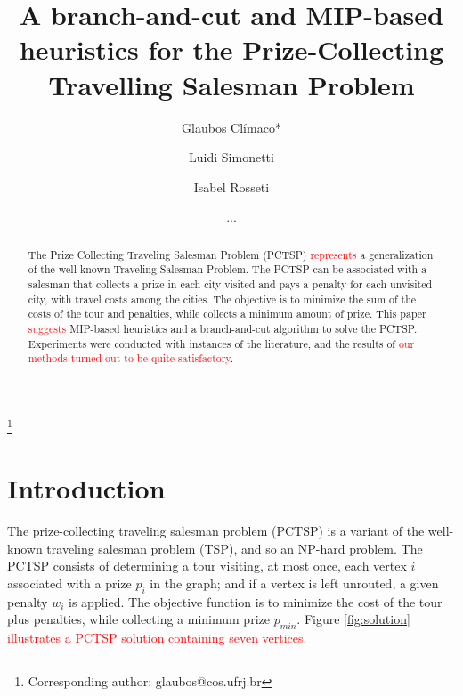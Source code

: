 \documentclass{ro}
\begin{document}
\title{A branch-and-cut and MIP-based heuristics for the Prize-Collecting Travelling Salesman Problem}%
%
\author{Glaubos Cl\'imaco*}\address{Universidade Federal do Rio de Janeiro, PESC-COPPE, Cidade Universit\'aria, Centro de Tecnologia, Bloco H, 21941-972, Rio de Janeiro, Brasil.}\thanks{Corresponding author: glaubos@cos.ufrj.br}
\author{Luidi Simonetti}\address{Universidade Federal do Rio de Janeiro, PESC-COPPE, Cidade Universit\'aria, Centro de Tecnologia, Bloco H, 21941-972, Rio de Janeiro, Brasil.}
\author{Isabel Rosseti}\address{ Universidade Federal Fluminense, Instituto de Computa\c{c}\~ao. Rua Passo da P\'atria 156 S\~ao Domingos 24210-240 - Niter\'oi, RJ - Brasil}
%
\date{...}
%
\begin{abstract} 

The Prize Collecting Traveling Salesman Problem
(PCTSP) \textcolor{red}{represents} a generalization of the well-known Traveling Salesman Problem. The PCTSP can be associated with a salesman that collects a prize in each city visited and pays a penalty for each unvisited city, with travel costs among the cities. The
objective is to minimize the sum of the costs of the tour
and penalties, while collects a minimum amount of prize.
This paper \textcolor{red}{suggests} MIP-based heuristics and a branch-and-cut algorithm to solve the PCTSP. Experiments were conducted with instances of the literature, and the results of \textcolor{red}{our methods turned out to be quite satisfactory}.

 \end{abstract}
%


%
%
\maketitle
\section{Introduction}

The prize-collecting traveling salesman problem (PCTSP) is a variant of the well-known traveling salesman problem (TSP), and so an NP-hard problem. The PCTSP consists of determining a tour visiting, at most once, each vertex $i$ associated with a prize $p_i$ in the graph; and if a vertex is left unrouted, a given penalty $w_i$ is applied. 
The objective function is to minimize the cost of the tour plus penalties, while collecting a minimum prize $p_{min}$. Figure \ref{fig:solution} \textcolor{red}{illustrates a PCTSP solution containing seven vertices}.
\end{document}
